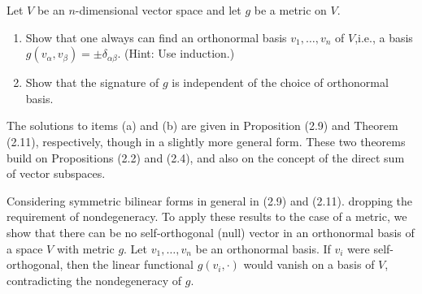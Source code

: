 \begin{problem}
    Let $V$ be an $n$-dimensional vector space and let $g$ be a metric on $V$.
    \begin{enumerate}[label=(\alph*)]
        \item Show that one always can find an orthonormal basis $v_1, \ldots , v_n$ of $V$,i.e., a basis $g(v_\alpha,v_\beta)=\pm\delta_{\alpha\beta}$. (Hint: Use induction.)
        \item Show that the signature of $g$ is independent of the choice of orthonormal basis.
    \end{enumerate}
\end{problem}
\begin{solution}
    The solutions to items (a) and (b) are given in Proposition (2.9) and Theorem (2.11), respectively, though in a slightly more general form. These two theorems build on Propositions (2.2) and (2.4), and also on the concept of the direct sum of vector subspaces.

    Considering symmetric bilinear forms in general in (2.9) and (2.11). dropping the requirement of nondegeneracy. To apply these results to the case of a metric, we show that there can be no self-orthogonal (null) vector in an orthonormal basis of a space $V$ with metric $g$. Let $v_1,\ldots,v_n$ be an orthonormal basis. If $v_i$ were self-orthogonal, then the linear functional $g(v_i,\cdot)$ would vanish on a basis of $V$, contradicting the nondegeneracy of $g$.
\end{solution}

